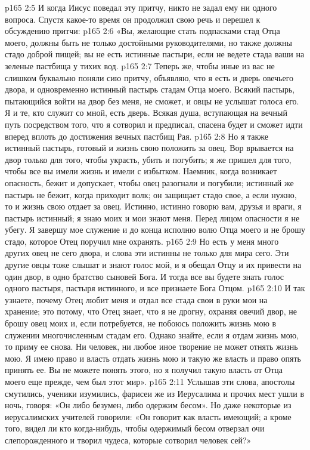\vs p165 2:5 \pc И когда Иисус поведал эту притчу, никто не задал ему ни одного вопроса. Спустя какое\hyp{}то время он продолжил свою речь и перешел к обсуждению притчи:
\vs p165 2:6 «Вы, желающие стать подпасками стад Отца моего, должны быть не только достойными руководителями, но также должны  стадо доброй пищей; вы не есть истинные пастыри, если не ведете стада ваши на зеленые пастбища у тихих вод.
\vs p165 2:7 Теперь же, чтобы иные из вас не слишком буквально поняли сию притчу, объявляю, что я есть и дверь овечьего двора, и одновременно истинный пастырь стадам Отца моего. Всякий пастырь, пытающийся войти на двор без меня, не сможет, и овцы не услышат голоса его. Я и те, кто служит со мной, есть дверь. Всякая душа, вступающая на вечный путь посредством того, что я сотворил и предписал, спасена будет и сможет идти вперед вплоть до достижения вечных пастбищ Рая.
\vs p165 2:8 Но я также истинный пастырь, готовый и жизнь свою положить за овец. Вор врывается на двор только для того, чтобы украсть, убить и погубить; я же пришел для того, чтобы все вы имели жизнь и имели с избытком. Наемник, когда возникает опасность, бежит и допускает, чтобы овец разогнали и погубили; истинный же пастырь не бежит, когда приходит волк; он защищает стадо свое, а если нужно, то и жизнь свою отдает за овец. Истинно, истинно говорю вам, друзья и враги, я пастырь истинный; я знаю моих и мои знают меня. Перед лицом опасности я не убегу. Я завершу мое служение и до конца исполню волю Отца моего и не брошу стадо, которое Отец поручил мне охранять.
\vs p165 2:9 Но есть у меня много других овец не сего двора, и слова эти истинны не только для мира сего. Эти другие овцы тоже слышат и знают голос мой, и я обещал Отцу и их привести на один двор, в одно братство сыновей Бога. И тогда все вы будете знать голос одного пастыря, пастыря истинного, и все признаете Бога Отцом.
\vs p165 2:10 И так узнаете, почему Отец любит меня и отдал все стада свои в руки мои на хранение; это потому, что Отец знает, что я не дрогну, охраняя овечий двор, не брошу овец моих и, если потребуется, не побоюсь положить жизнь мою в служении многочисленным стадам его. Однако знайте, если я отдам жизнь мою, то приму ее снова. Ни человек, ни любое иное творение не может отнять жизнь мою. Я имею право и власть отдать жизнь мою и такую же власть и право опять принять ее. Вы не можете понять этого, но я получил такую власть от Отца моего еще прежде, чем был этот мир».
\vs p165 2:11 \pc Услышав эти слова, апостолы смутились, ученики изумились, фарисеи же из Иерусалима и прочих мест ушли в ночь, говоря: «Он либо безумен, либо одержим бесом». Но даже некоторые из иерусалимских учителей говорили: «Он говорит как власть имеющий; а кроме того, видел ли кто когда\hyp{}нибудь, чтобы одержимый бесом отверзал очи слепорожденного и творил чудеса, которые сотворил человек сей?»
